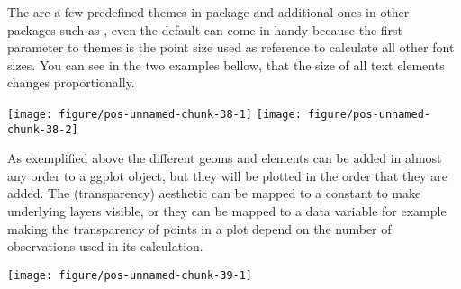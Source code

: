 \documentclass[paper=a4,headsepline,BCOR=12mm,twoside,open=right,%
titlepage,headings=small,fontsize=10pt,index=totoc,bibliography=totoc,%
captions=tableheading,captions=nooneline]{scrbook}\usepackage{knitr}
\begin{document}
The are a few predefined themes in package \ggplot and additional ones in other packages such as \cowplot, even the default  can come in handy because the first parameter to themes is the point size used as reference to calculate all other font sizes. You can see in the two examples bellow, that the size of all text elements changes proportionally.

\begin{knitrout}\footnotesize
{}\color{fgcolor}\begin{kframe}
\begin{alltt}
 \hlopt{+}  \hlopt{+} \hlstd{(}\hlstd{)}
 \hlopt{+}  \hlopt{+} \hlstd{(}\hlstd{)}
\end{alltt}
\end{kframe}

{\centering \texttt{[image: figure/pos-unnamed-chunk-38-1]} 
\texttt{[image: figure/pos-unnamed-chunk-38-2]} 

}



\end{knitrout}

As exemplified above the different geoms and elements can be added in almost any order to a ggplot object, but they will be plotted in the order that they are added. The  (transparency) aesthetic can be mapped to a constant to make underlying layers visible, or they can be mapped to a data variable for example making the transparency of points in a plot depend on the number of observations used in its calculation.

\begin{knitrout}\footnotesize
{}\color{fgcolor}\begin{kframe}
\begin{alltt}
\hlstd{(}  \hlstd{(}  \hlstd{=} \hlopt{+}
  \hlstd{()} \hlopt{+} \hlstd{(}\hlstd{=}\hlstd{,} \hlstd{=}\hlstd{)}
\end{alltt}
\end{kframe}

{\centering \texttt{[image: figure/pos-unnamed-chunk-39-1]} 

}



\end{knitrout}
\end{document}
